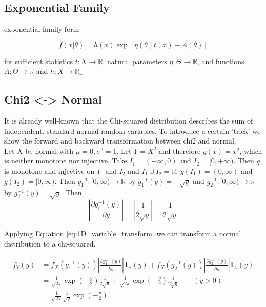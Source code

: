 \documentclass{article}
\begin{document}
\subsection{Exponential Family}

exponential family form

\begin{equation}
f(x|\theta) = h(x)\exp[\eta(\theta) t(x) - A(\theta)]
\label{eq:exp_family}
\end{equation}

for sufficient statistics $t:X \rightarrow \mathbb{R}$, natural parameters $\eta: \Theta \rightarrow \mathbb{R}$, and functions $A: \Theta \rightarrow \mathbb{R}$ and $h: X \rightarrow \mathbb{R}_+$

\subsection{Chi2 <-> Normal}
\label{subsec:chi2-normal}

It is already well-known that the Chi-squared distribution describes the sum of independent, standard normal random variables. To introduce a certain 'trick' we show the forward and backward transformation between chi2 and normal.\\
Let $X$ be normal with $\mu = 0, \sigma^2 = 1$. Let $Y = X^2$ and therefore $g(x) = x^2$, which is neither monotone nor injective. Take $I_1 = (-\infty, 0)$ and $I_2 = [0, +\infty)$. Then $g$ is monotone and injective on $I_1$ and $I_2$ and $I_1 \cup I_2 = \mathbb{R}$. $g(I_1) = (0, \infty)$ and $g(I_2) = [0, \infty)$. Then $g_1^{-1}: [0, \infty) \rightarrow \mathbb{R}$ by $g_1^{-1}(y) = -\sqrt{y}$ and $g_2^{-1}: [0, \infty) \rightarrow \mathbb{R}$ by $g_2^{-1}(y) = \sqrt{y}$. Then
$$\left\vert \frac{\partial g_i^{-1}(y)}{\partial y} \right\vert = \left\vert \frac{1}{2 \sqrt{y}} \right\vert = \frac{1}{2 \sqrt{y}}$$

Applying Equation \ref{eq:1D_variable_transform} we can transform a normal distribution to a chi-squared.

\begin{align}
f_Y(y) &= f_X(g_1^{-1}(y))	\left\vert\frac{\partial g_1^{-1}(y)}{\partial y} \right\vert \mathbf{1}_\wedge(y) + f_X(g_2^{-1}(y))	\left\vert\frac{\partial g_2^{-1}(y)}{\partial y} \right\vert \mathbf{1}_\wedge(y) \nonumber\\
&= \frac{1}{\sqrt{2\pi}} \exp(-\frac{y}{2}) \frac{1}{2\sqrt{y}} + \frac{1}{\sqrt{2\pi}} \exp(-\frac{y}{2}) \frac{1}{2\sqrt{y}} \qquad(y > 0)\\
&= \frac{1}{\sqrt{2\pi}} \frac{1}{\sqrt{y}}\exp(-\frac{y}{2}) \nonumber
\end{align}
\end{document}
